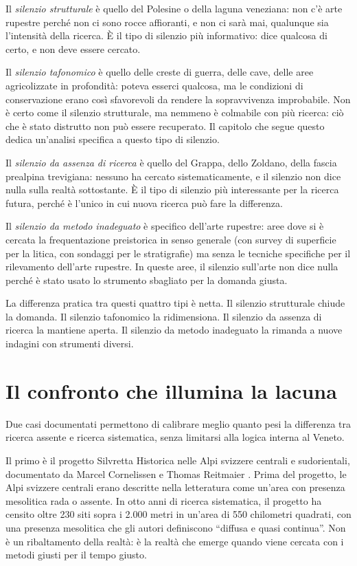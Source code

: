 Il \emph{silenzio strutturale} è quello del Polesine o della laguna veneziana: non c'è arte rupestre perché non ci sono rocce affioranti, e non ci sarà mai, qualunque sia l'intensità della ricerca. È il tipo di silenzio più informativo: dice qualcosa di certo, e non deve essere cercato.

Il \emph{silenzio tafonomico} è quello delle creste di guerra, delle cave, delle aree agricolizzate in profondità: poteva esserci qualcosa, ma le condizioni di conservazione erano così sfavorevoli da rendere la sopravvivenza improbabile. Non è certo come il silenzio strutturale, ma nemmeno è colmabile con più ricerca: ciò che è stato distrutto non può essere recuperato. Il capitolo che segue questo dedica un'analisi specifica a questo tipo di silenzio.

Il \emph{silenzio da assenza di ricerca} è quello del Grappa, dello Zoldano, della fascia prealpina trevigiana: nessuno ha cercato sistematicamente, e il silenzio non dice nulla sulla realtà sottostante. È il tipo di silenzio più interessante per la ricerca futura, perché è l'unico in cui nuova ricerca può fare la differenza.

Il \emph{silenzio da metodo inadeguato} è specifico dell'arte rupestre: aree dove si è cercata la frequentazione preistorica in senso generale (con survey di superficie per la litica, con sondaggi per le stratigrafie) ma senza le tecniche specifiche per il rilevamento dell'arte rupestre. In queste aree, il silenzio sull'arte non dice nulla perché è stato usato lo strumento sbagliato per la domanda giusta.

La differenza pratica tra questi quattro tipi è netta. Il silenzio strutturale chiude la domanda. Il silenzio tafonomico la ridimensiona. Il silenzio da assenza di ricerca la mantiene aperta. Il silenzio da metodo inadeguato la rimanda a nuove indagini con strumenti diversi.

\section{Il confronto che illumina la lacuna}

Due casi documentati permettono di calibrare meglio quanto pesi la differenza tra ricerca assente e ricerca sistematica, senza limitarsi alla logica interna al Veneto.

Il primo è il progetto Silvretta Historica nelle Alpi svizzere centrali e sudorientali, documentato da Marcel Cornelissen e Thomas Reitmaier \citep{cornelissen2016}. Prima del progetto, le Alpi svizzere centrali erano descritte nella letteratura come un'area con presenza mesolitica rada o assente. In otto anni di ricerca sistematica, il progetto ha censito oltre 230 siti sopra i 2.000 metri in un'area di 550 chilometri quadrati, con una presenza mesolitica che gli autori definiscono ``diffusa e quasi continua''. Non è un ribaltamento della realtà: è la realtà che emerge quando viene cercata con i metodi giusti per il tempo giusto.


